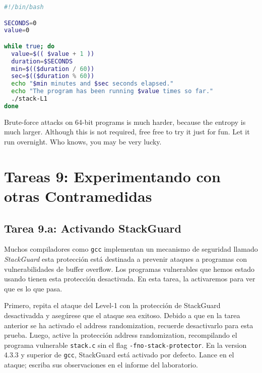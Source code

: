 \begin{lstlisting}[language=bash]
#!/bin/bash

SECONDS=0
value=0

while true; do
  value=$(( $value + 1 ))
  duration=$SECONDS
  min=$(($duration / 60))
  sec=$(($duration % 60))
  echo "$min minutes and $sec seconds elapsed."
  echo "The program has been running $value times so far."
  ./stack-L1
done
\end{lstlisting}


Brute-force attacks on 64-bit programs is much harder, because the entropy
is much larger. Although this is not required, free free to try it just for fun. 
Let it run overnight. Who knows, you may be very lucky. 


\section{Tareas 9: Experimentando con otras Contramedidas}


\subsection{Tarea 9.a: Activando StackGuard}

Muchos compiladores como \texttt{gcc} implementan un mecanismo de seguridad llamado \textit{StackGuard} esta protección está destinada a prevenir ataques a programas con vulnerabilidades de buffer overflow. Los programas vulnerables que hemos estado usando tienen esta protección desactivada. 
En esta tarea, la activaremos para ver que es lo que pasa.

Primero, repita el ataque del Level-1 con la protección de StackGuard desactivadda y asegúrese que el ataque sea exitoso. Debido a que en la tarea anterior se ha activado el address randomization, recuerde desactivarlo para esta prueba.
Luego, active la protección address randomization, recompilando el programa vulnerable \texttt{stack.c} sin el flag \texttt{-fno-stack-protector}.
En la version 4.3.3 y superior de \texttt{gcc}, StackGuard está activado por defecto. 
Lance en el ataque; escriba sus observaciones en el informe del laboratorio.



